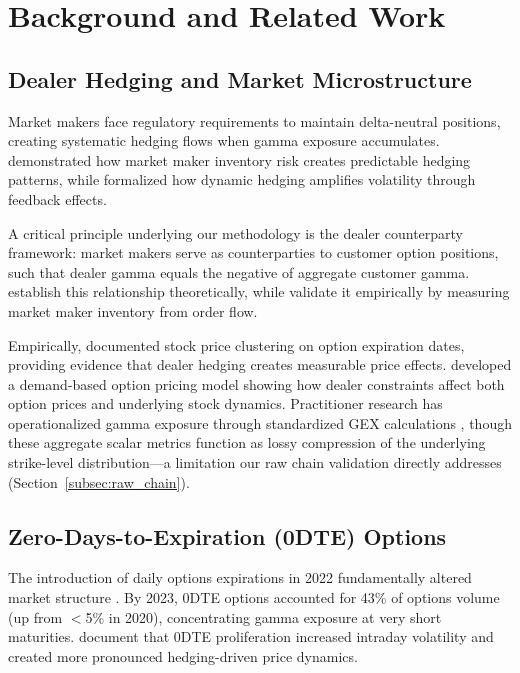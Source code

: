 \section{Background and Related Work}
\label{sec:related}

\subsection{Dealer Hedging and Market Microstructure}

Market makers face regulatory requirements to maintain delta-neutral positions, creating systematic hedging flows when gamma exposure accumulates. \citet{grossman1988liquidity} demonstrated how market maker inventory risk creates predictable hedging patterns, while \citet{frey1997market} formalized how dynamic hedging amplifies volatility through feedback effects.

A critical principle underlying our methodology is the dealer counterparty framework: market makers serve as counterparties to customer option positions, such that dealer gamma equals the negative of aggregate customer gamma. \citet{anderegg2022impact} establish this relationship theoretically, while \citet{dim2025zero} validate it empirically by measuring market maker inventory from order flow.

Empirically, \citet{ni2005stock} documented stock price clustering on option expiration dates, providing evidence that dealer hedging creates measurable price effects. \citet{garleanu2009demand} developed a demand-based option pricing model showing how dealer constraints affect both option prices and underlying stock dynamics. Practitioner research has operationalized gamma exposure through standardized GEX calculations \citep{spotgamma2021,anderegg2022impact}, though these aggregate scalar metrics function as lossy compression of the underlying strike-level distribution---a limitation our raw chain validation directly addresses (Section~\ref{subsec:raw_chain}).

\subsection{Zero-Days-to-Expiration (0DTE) Options}

The introduction of daily options expirations in 2022 fundamentally altered market structure \citep{cboe2024zero}. By 2023, 0DTE options accounted for 43\% of options volume (up from $<$5\% in 2020), concentrating gamma exposure at very short maturities. \citet{dim2025zero} document that 0DTE proliferation increased intraday volatility and created more pronounced hedging-driven price dynamics.

